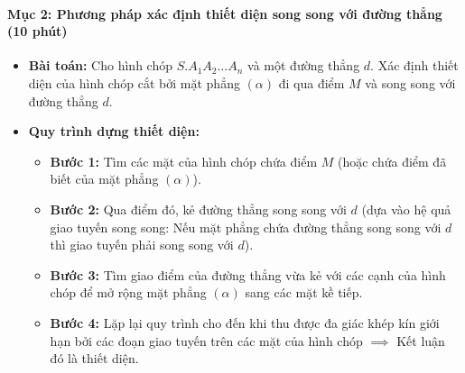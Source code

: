 \documentclass[12pt, a4paper]{article}
\begin{document}
\paragraph{Mục 2: Phương pháp xác định thiết diện song song với đường thẳng (10 phút)}
\begin{itemize}
    \item \textbf{Bài toán:} Cho hình chóp $S.A_1A_2\dots A_n$ và một đường thẳng $d$. Xác định thiết diện của hình chóp cắt bởi mặt phẳng $(\alpha)$ đi qua điểm $M$ và song song với đường thẳng $d$.
    \item \textbf{Quy trình dựng thiết diện:}
    \begin{itemize}
        \item \textbf{Bước 1:} Tìm các mặt của hình chóp chứa điểm $M$ (hoặc chứa điểm đã biết của mặt phẳng $(\alpha)$).
        \item \textbf{Bước 2:} Qua điểm đó, kẻ đường thẳng song song với $d$ (dựa vào hệ quả giao tuyến song song: Nếu mặt phẳng chứa đường thẳng song song với $d$ thì giao tuyến phải song song với $d$).
        \item \textbf{Bước 3:} Tìm giao điểm của đường thẳng vừa kẻ với các cạnh của hình chóp để mở rộng mặt phẳng $(\alpha)$ sang các mặt kề tiếp.
        \item \textbf{Bước 4:} Lặp lại quy trình cho đến khi thu được đa giác khép kín giới hạn bởi các đoạn giao tuyến trên các mặt của hình chóp $\implies$ Kết luận đó là thiết diện.
    \end{itemize}
\end{itemize}
\end{document}

